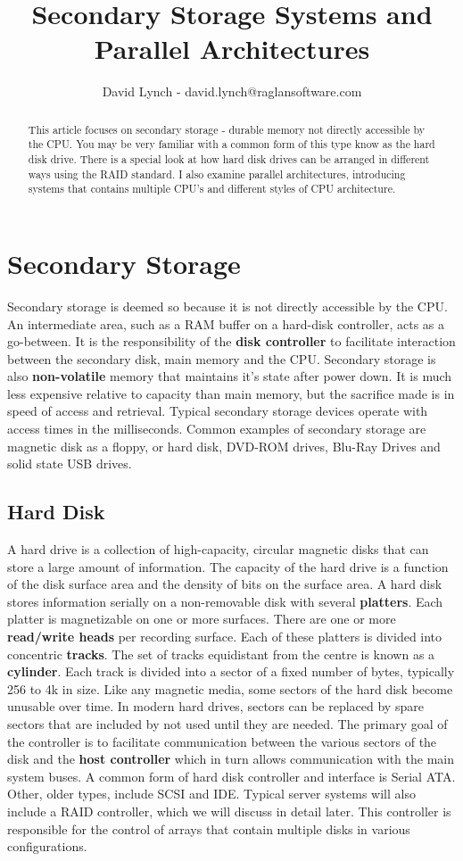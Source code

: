 \documentclass[10pt,a4paper]{article}
\title{Secondary Storage Systems and Parallel Architectures}
\author{David Lynch - david.lynch@raglansoftware.com }
\begin{document}
\maketitle
\begin{abstract}
This article focuses on secondary storage - durable memory not directly accessible by the CPU. You may be very familiar with a common form of this type know as the hard disk drive. There is a special look at how hard disk drives can be arranged in different ways using the RAID standard. I also examine parallel architectures, introducing systems that contains multiple CPU's and different styles of CPU architecture. 
\end{abstract}
\section{Secondary Storage}
Secondary storage is deemed so because it is not directly accessible by the CPU. An intermediate area, such as a RAM buffer on a hard-disk controller, acts as a go-between. It is the responsibility of the {\bf disk controller} to facilitate interaction between the secondary disk, main memory and the CPU. Secondary storage is also {\bf non-volatile} memory that maintains it's state after power down. It is much less expensive relative to capacity than main memory, but the sacrifice made is in speed of access and retrieval. Typical secondary storage devices operate with access times in the milliseconds. Common examples of secondary storage are magnetic disk as a floppy, or hard disk, DVD-ROM drives, Blu-Ray Drives and solid state USB drives.
\subsection{Hard Disk}
A hard drive is a collection of high-capacity, circular magnetic disks that can store a large amount of information. The capacity of the hard drive is a function of the disk surface area and the density of bits on the surface area. A hard disk stores information serially on a non-removable disk with several {\bf platters}. Each platter is magnetizable on one or more surfaces. There are one or more {\bf read/write heads} per recording surface. Each of these platters is divided into concentric {\bf tracks}. The set of tracks equidistant from the centre is known as a {\bf cylinder}. Each track is divided into a sector of a fixed number of bytes, typically 256 to 4k in size. Like any magnetic media, some sectors of the hard disk become unusable over time. In modern hard drives, sectors can be replaced by spare sectors that are included by not used until they are needed. The primary goal of the controller is to facilitate communication between the various sectors of the disk and the {\bf host controller} which in turn allows communication with the main system buses. A common form of hard disk controller and interface is Serial ATA. Other, older types, include SCSI and IDE. Typical server systems will also include a RAID controller, which we will discuss in detail later. This controller is responsible for the control of arrays that contain multiple disks in various configurations. 
\end{document}
